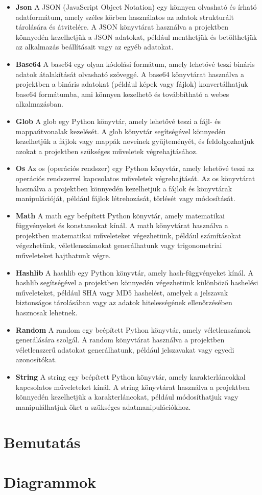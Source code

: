 \begin{itemize}
 	 \item\textbf{Json}
A JSON (JavaScript Object Notation) egy könnyen olvasható és írható adatformátum, amely széles körben használatos az adatok strukturált tárolására és átvitelére. A JSON könyvtárat használva a projektben könnyedén kezelhetjük a JSON adatokat, például menthetjük és betölthetjük az alkalmazás beállításait vagy az egyéb adatokat.

 	 \item\textbf{Base64}
A base64 egy olyan kódolási formátum, amely lehetővé teszi bináris adatok átalakítását olvasható szöveggé. A base64 könyvtárat használva a projektben a bináris adatokat (például képek vagy fájlok) konvertálhatjuk base64 formátumba, ami könnyen kezelhető és továbbítható a webes alkalmazásban.

 	 \item\textbf{Glob}
A glob egy Python könyvtár, amely lehetővé teszi a fájl- és mappaútvonalak kezelését. A glob könyvtár segítségével könnyedén kezelhetjük a fájlok vagy mappák neveinek gyűjteményét, és feldolgozhatjuk azokat a projektben szükséges műveletek végrehajtásához.

 	 \item\textbf{Os}
Az os (operációs rendszer) egy Python könyvtár, amely lehetővé teszi az operációs rendszerrel kapcsolatos műveletek végrehajtását. Az os könyvtárat használva a projektben könnyedén kezelhetjük a fájlok és könyvtárak manipulációját, például fájlok létrehozását, törlését vagy módosítását.


 	 \item\textbf{Math}
A math egy beépített Python könyvtár, amely matematikai függvényeket és konstansokat kínál. A math könyvtárat használva a projektben matematikai műveleteket végezhetünk, például számításokat végezhetünk, véletlenszámokat generálhatunk vagy trigonometriai műveleteket hajthatunk végre.

 	 \item\textbf{Hashlib}
A hashlib egy Python könyvtár, amely hash-függvényeket kínál. A hashlib segítségével a projektben könnyedén végezhetünk különböző hashelési műveleteket, például SHA vagy MD5 hashelést, amelyek a jelszavak biztonságos tárolásában vagy az adatok hitelességének ellenőrzésében hasznosak lehetnek.

 	 \item\textbf{Random}
A random egy beépített Python könyvtár, amely véletlenszámok generálására szolgál. A random könyvtárat használva a projektben véletlenszerű adatokat generálhatunk, például jelszavakat vagy egyedi azonosítókat.

 	 \item\textbf{String}
A string egy beépített Python könyvtár, amely karakterláncokkal kapcsolatos műveleteket kínál. A string könyvtárat használva a projektben könnyedén kezelhetjük a karakterláncokat, például módosíthatjuk vagy manipulálhatjuk őket a szükséges adatmanipulációkhoz.

\end{itemize}


\section {Bemutatás}

\section {Diagrammok}
